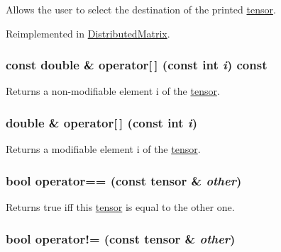 Allows the user to select the destination of the printed \hyperlink{classJKBuilder_1_1tensor}{tensor}. 

Reimplemented in \hyperlink{classJKBuilder_1_1DistributedMatrix_a74b2fe351a5444c1325870dc6162f451}{DistributedMatrix}.\hypertarget{classJKBuilder_1_1tensor_a4f0dc1b84b580cec49500c70f87e084a}{
\subsubsection[{operator[]}]{\setlength{\rightskip}{0pt plus 5cm}const double \& operator\mbox{[}$\,$\mbox{]} (const int {\em i}) const}}
\label{classJKBuilder_1_1tensor_a4f0dc1b84b580cec49500c70f87e084a}


Returns a non-\/modifiable element i of the \hyperlink{classJKBuilder_1_1tensor}{tensor}. \hypertarget{classJKBuilder_1_1tensor_a38c9fed6b117f7cf8b76785648d76b62}{
\subsubsection[{operator[]}]{\setlength{\rightskip}{0pt plus 5cm}double \& operator\mbox{[}$\,$\mbox{]} (const int {\em i})}}
\label{classJKBuilder_1_1tensor_a38c9fed6b117f7cf8b76785648d76b62}


Returns a modifiable element i of the \hyperlink{classJKBuilder_1_1tensor}{tensor}. \hypertarget{classJKBuilder_1_1tensor_a10ae0b61e655854d12c6465d2b9e3506}{
\subsubsection[{operator==}]{\setlength{\rightskip}{0pt plus 5cm}bool operator== (const {\bf tensor} \& {\em other})}}
\label{classJKBuilder_1_1tensor_a10ae0b61e655854d12c6465d2b9e3506}


Returns true iff this \hyperlink{classJKBuilder_1_1tensor}{tensor} is equal to the other one. \hypertarget{classJKBuilder_1_1tensor_a9b42dd835ddf2eb1a26b5d525b59b2b8}{
\subsubsection[{operator!=}]{\setlength{\rightskip}{0pt plus 5cm}bool operator!= (const {\bf tensor} \& {\em other})}}
\label{classJKBuilder_1_1tensor_a9b42dd835ddf2eb1a26b5d525b59b2b8}


